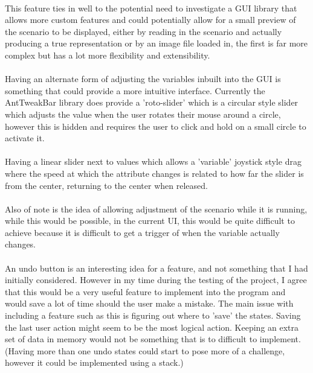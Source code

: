 \paragraph{}
This feature ties in well to the potential need to investigate a GUI library that allows more custom features and could potentially allow for a small preview of the scenario to be displayed, either by reading in the scenario and actually producing a true representation or by an image file loaded in, the first is far more complex but has a lot more flexibility and extensibility.

\paragraph{}
Having an alternate form of adjusting the variables inbuilt into the GUI is something that could provide a more intuitive interface. Currently the AntTweakBar library does provide a 'roto-slider' which is a circular style slider which adjusts the value when the user rotates their mouse around a circle, however this is hidden and requires the user to click and hold on a small circle to activate it.

\paragraph{}
Having a linear slider next to values which allows a 'variable' joystick style drag where the speed at which the attribute changes is related to how far the slider is from the center, returning to the center when released.

\paragraph{}
Also of note is the idea of allowing adjustment of the scenario while it is running, while this would be possible, in the current UI, this would be quite difficult to achieve because it is difficult to get a trigger of when the variable actually changes.

\paragraph{}
An undo button is an interesting idea for a feature, and not something that I had initially considered. However in my time during the testing of the project, I agree that this would be a very useful feature to implement into the program and would save a lot of time should the user make a mistake. The main issue with including a feature such as this is figuring out where to 'save' the states. Saving the last user action might seem to be the most logical action. Keeping an extra set of data in memory would not be something that is to difficult to implement. (Having more than one undo states could start to pose more of a challenge, however it could be implemented using a stack.)

